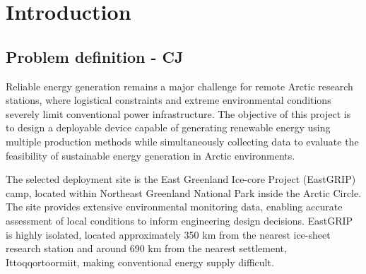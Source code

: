 \documentclass[11pt,a4paper]{article}
\begin{document}







\printnomenclature
\newpage

\section{Introduction}

\subsection{Problem definition - CJ}
Reliable energy generation remains a major challenge for remote Arctic research stations, where logistical constraints and extreme environmental conditions severely limit conventional power infrastructure. The objective of this project is to design a deployable device capable of generating renewable energy using multiple production methods while simultaneously collecting data to evaluate the feasibility of sustainable energy generation in Arctic environments.

The selected deployment site is the East Greenland Ice-core Project (EastGRIP) camp, located within Northeast Greenland National Park inside the Arctic Circle. The site provides extensive environmental monitoring data, enabling accurate assessment of local conditions to inform engineering design decisions. EastGRIP is highly isolated, located approximately 350 km from the nearest ice-sheet research station and around 690 km from the nearest settlement, Ittoqqortoormiit, making conventional energy supply difficult.
\end{document}
